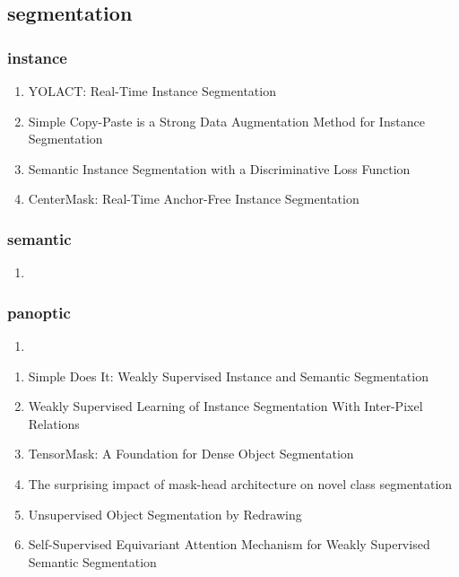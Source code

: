 \documentclass[acmlarge]{acmart}
\begin{document}
	\subsection{segmentation}
		\subsubsection{instance}
		\begin{enumerate}
			\item YOLACT: Real-Time Instance Segmentation \cite{Bolya2019YOLACTRI} 

			\item Simple Copy-Paste is a Strong Data Augmentation Method for Instance Segmentation \cite{Ghiasi2021SimpleCI} 

			\item Semantic Instance Segmentation with a Discriminative Loss Function \cite{Brabandere2017SemanticIS} 

			\item CenterMask: Real-Time Anchor-Free Instance Segmentation \cite{Lee2020CenterMaskRA} 

		\end{enumerate}
		\subsubsection{semantic}
		\begin{enumerate}
			\item
		\end{enumerate}
		\subsubsection{panoptic}
		\begin{enumerate}
			\item
		\end{enumerate}
	\begin{enumerate}
		\item Simple Does It: Weakly Supervised Instance and Semantic Segmentation \cite{Khoreva2017SimpleDI} 

		\item Weakly Supervised Learning of Instance Segmentation With Inter-Pixel Relations \cite{Ahn2019WeaklySL} 

		\item TensorMask: A Foundation for Dense Object Segmentation \cite{Chen2019TensorMaskAF} 

		\item The surprising impact of mask-head architecture on novel class segmentation \cite{Birodkar2021TheSI} 

		\item Unsupervised Object Segmentation by Redrawing \cite{Chen2019UnsupervisedOS} 

		\item Self-Supervised Equivariant Attention Mechanism for Weakly Supervised Semantic Segmentation \cite{Wang2020SelfSupervisedEA} 

	\end{enumerate}
\end{document}
